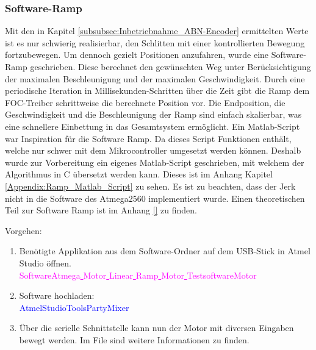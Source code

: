 \subsubsection{Software-Ramp}
\label{subsubsec:Software_Ramp}

Mit den in Kapitel \ref{subsubsec:Inbetriebnahme_ABN-Encoder} ermittelten Werte ist es nur schwierig realisierbar, den Schlitten mit einer kontrollierten Bewegung fortzubewegen. Um dennoch gezielt Positionen anzufahren, wurde eine Software-Ramp geschrieben. Diese berechnet den gewünschten Weg unter Berücksichtigung der maximalen Beschleunigung und der maximalen Geschwindigkeit. Durch eine periodische Iteration in Millisekunden-Schritten über die Zeit gibt die Ramp dem FOC-Treiber schrittweise die berechnete Position vor. Die Endposition, die Geschwindigkeit und die Beschleunigung der Ramp sind einfach skalierbar, was eine schnellere Einbettung in das Gesamtsystem ermöglicht. Ein Matlab-Script war Inspiration für die Software Ramp. Da dieses Script Funktionen enthält, welche nur schwer mit dem Mikrocontroller umgesetzt werden können. Deshalb wurde zur Vorbereitung ein eigenes Matlab-Script geschrieben, mit welchem der Algorithmus in C übersetzt werden kann. Dieses ist im Anhang Kapitel \ref{Appendix:Ramp_Matlab_Script} zu sehen. Es ist zu beachten, dass der Jerk nicht in die Software des Atmega2560 implementiert wurde. Einen theoretischen Teil zur Software Ramp ist im Anhang \ref{} zu finden. \cite{bearee_gentrajm_2007}

Vorgehen:
\begin{enumerate}
\item Benötigte Applikation aus dem Software-Ordner auf dem USB-Stick in Atmel Studio öffnen.\\
\textcolor{magenta}{Software\textrightarrow Atmega\underline{ }Motor\underline{ }Linear\underline{ }Ramp\underline{ }Motor\underline{ }Testsoftware\textrightarrow Motor}\\

\item Software hochladen:\\
\textcolor{blue}{AtmelStudio\textrightarrow Tools\textrightarrow PartyMixer}\\

\item Über die serielle Schnittstelle kann nun der Motor mit diversen Eingaben bewegt werden. Im File sind weitere Informationen zu finden.

\end{enumerate}